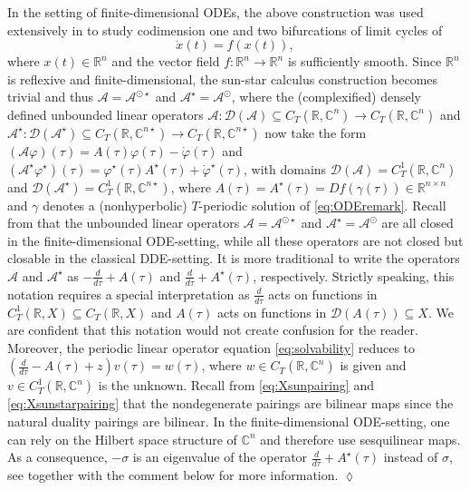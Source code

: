 \documentclass[english]{myarticle}
\begin{document}
\begin{sloppypar}
\begin{remark} \label{remark:ODE}
In the setting of finite-dimensional ODEs, the above construction was used extensively in \cite{Kuznetsov2005,Witte2013,Witte2014} to study codimension one and two bifurcations of limit cycles of
\begin{equation} \label{eq:ODEremark}
    \dot{x}(t) = f(x(t)),
\end{equation}
where $x(t) \in \mathbb{R}^n$ and the vector field $f : \mathbb{R}^n \to \mathbb{R}^n$ is sufficiently smooth. Since $\mathbb{R}^n$ is reflexive and finite-dimensional, the sun-star calculus construction becomes trivial \cite[Section 1]{Neerven1992} and thus $\mathcal{A} = \mathcal{A}^{\odot \star}$ and $\mathcal{A}^{\star} = \mathcal{A}^\odot$, where the (complexified) densely defined unbounded linear operators $\mathcal{A} : \mathcal{D}(\mathcal{A}) \subseteq  C_T(\mathbb{R},\mathbb{C}^n) \to C_T(\mathbb{R},\mathbb{C}^n)$ and $\mathcal{A}^\star : \mathcal{D}(\mathcal{A}^\star) \subseteq C_T(\mathbb{R},\mathbb{C}^{n \star}) \to C_T(\mathbb{R},\mathbb{C}^{n \star})$ now take the form $(\mathcal{A}\varphi)(\tau) = A(\tau)\varphi(\tau) - \dot{\varphi}(\tau)$ and $(\mathcal{A}^\star\varphi^\star)(\tau) = \varphi^\star(\tau) A^\star(\tau) + \dot{\varphi}^\star(\tau)$, with domains $\mathcal{D}(\mathcal{A}) = C_T^1(\mathbb{R},\mathbb{C}^n)$ and $\mathcal{D}(\mathcal{A}^\star) = C_T^1(\mathbb{R},\mathbb{C}^{n \star})$, where $A(\tau) = A^\star(\tau) = Df(\gamma(\tau)) \in \mathbb{R}^{n \times n}$ and $\gamma$ denotes a (nonhyperbolic) $T$-periodic solution of \eqref{eq:ODEremark}. Recall from \cite[Remark 8 and 15]{Article1} that the unbounded linear operators $\mathcal{A} = \mathcal{A}^{\odot \star}$ and $\mathcal{A}^{\star} = \mathcal{A}^\odot$ are all closed in the finite-dimensional ODE-setting, while all these operators are not closed but closable in the classical DDE-setting. It is more traditional \cite{Iooss1988,Iooss1999,Kuznetsov2005,Kuznetsov2023a,Witte2013,Witte2014} to write the operators $\mathcal{A}$ and $\mathcal{A}^\star$ as $-\frac{d}{d\tau}+A(\tau)$ and $\frac{d}{d\tau}+A^\star(\tau)$, respectively. Strictly speaking, this notation requires a special interpretation as $\frac{d}{d\tau}$ acts on functions in $C_T^1(\mathbb{R},X) \subseteq C_T(\mathbb{R},X)$ and $A(\tau)$ acts on functions in $\mathcal{D}(A(\tau)) \subseteq X$. We are confident that this notation would not create confusion for the reader. Moreover, the periodic linear operator equation \eqref{eq:solvability} reduces to $(\frac{d}{d\tau} - A(\tau) + z) v(\tau) = w(\tau)$, where $w \in C_T(\mathbb{R},\mathbb{C}^n)$ is given and $v \in C_T^1(\mathbb{R},\mathbb{C}^n)$ is the unknown. Recall from \eqref{eq:Xsunpairing} and \eqref{eq:Xsunstarpairing} that the nondegenerate pairings are bilinear maps since the natural duality pairings are bilinear. In the finite-dimensional ODE-setting, one can rely on the Hilbert space structure of $\mathbb{C}^n$ and therefore use sesquilinear maps. As a consequence, $-\sigma$ is an eigenvalue of the operator $\frac{d}{d\tau} + A^\star(\tau)$ instead of $\sigma$, see \cite[Equation (2.34)]{Kuznetsov2005} together with the comment below \cite[Equation (3.27)]{Witte2013} for more information. \hfill $\lozenge$

\end{remark}
\end{sloppypar}
\end{document}
